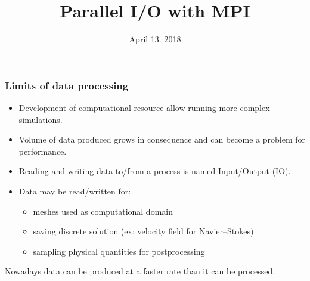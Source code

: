 

\newcommand{\xR}{\mathbb{R}}
\newcommand{\xRd}{{\xR^d}}
\newcommand{\xRN}{{\xR^N}}
\newcommand{\xMNR}{{M_N(\xR)}}
\newcommand{\bb}{{\boldsymbol b}}
\newcommand{\ee}{{\boldsymbol e}}
\newcommand{\ev}{{\boldsymbol \epsilon}}
\newcommand{\rr}{{\boldsymbol r}}
\newcommand{\xx}{{\boldsymbol x}}
\newcommand{\hx}{\hat{\boldsymbol x}}
\newcommand{\yy}{{\boldsymbol y}}
\newcommand{\vv}{{\boldsymbol v}}
\newcommand{\ww}{{\boldsymbol w}}
\newcommand{\zz}{{\boldsymbol z}}
\renewcommand{\mA}{{\mathrm A}}
\newcommand{\mB}{{\mathrm B}}
\newcommand{\mC}{{\mathrm C}}
\newcommand{\mD}{{\mathrm D}}
\newcommand{\mG}{{\mathrm G}}
\newcommand{\mH}{{\mathrm H}}
\renewcommand{\mL}{{\mathrm L}}
\newcommand{\mLs}{{\mathrm L_0}}
\newcommand{\mM}{{\mathrm M}}
\newcommand{\mRs}{{\mathrm R_0}}
\newcommand{\mR}{{\mathrm R}}
\newcommand{\mP}{{\mathrm P}}
\newcommand{\mQ}{{\mathrm Q}}
\newcommand{\mU}{{\mathrm U}}
\newcommand{\mId}{{\mathbf{Id}}}
\newcommand{\mII}{{\mathbf{\mathbb{I}}}}
\newcommand{\Seq}[1]{\bigl(#1\bigr)}
\newcommand{\Cond}[1]{\mathcal{C}(#1)}
\newcommand{\Order}[1]{\mathcal{O}\left(#1\right)}
\newcommand{\norm}[1]{{\lVert #1 \rVert}}
\newcommand{\norminf}[1]{\norm{#1}_{\infty}}

\newcommand{\InnerK}[2]{{{\mathbf\langle}\;#1\:,\: #2 \;{\rangle}}}
\newcommand{\Inner}[2]{{{\scriptstyle\mathbf{(}}\;#1\:,\: #2 \;{\scriptstyle\mathbf{)}}}}


\title{Parallel I/O with MPI}
\date{April 13. 2018}

\maketitle

\begin{frame}
  \frametitle{Limits of data processing}

  \begin{itemize}
  \item Development of computational resource allow running more complex simulations.
  \item Volume of data produced grows in consequence and can become a problem for performance.
  \item Reading and writing data to/from a process is named Input/Output (IO).
  \item Data may be read/written for:
  \begin{itemize}
  \item meshes used as computational domain
  \item saving discrete solution (ex: velocity field for Navier--Stokes)
  \item sampling physical quantities for postprocessing
  \end{itemize}
  \end{itemize}

Nowadays data can be produced at a faster rate than it can be processed.
\end{frame}

